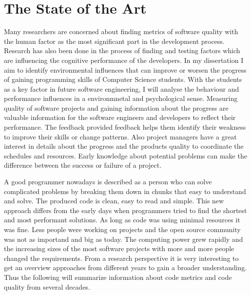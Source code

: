 \chapter{The State of the Art}

\begin{flushleft}
Many researchers are concerned about finding metrics of software quality with the human factor as the most significant part in the development process. 
Research has also been done in the process of finding and testing factors which are influencing the cognitive performance of the developers.
In my dissertation I aim to identify environmental influences that can improve or worsen the progress of gaining programming skills of Computer Science students.
With the students as a key factor in future software engineering, I will analyse the behaviour and performance influences in a environmnetal and psychological sense. 
\cite{denissen2008effects}
Measuring quality of software projects and gaining information about the progress are valuable information for the software engineers and developers to reflect their performance. The feedback provided feedback helps them identify their weakness to improve their skills or change patterns. 
\cite{johnson1999leap}
\cite{Martin:2008:CCH:1388398}
Also project managers have a great interest in details about the progress and the products quality to coordinate the schedules and resources. 
Early knowledge about potential problems can make the difference between the success or failure of a project.

A good programmer nowadays is described as a person who can solve complicated problems by breaking them down in chunks that easy to understand and solve. The produced code is clean, easy to read and simple. \cite{johnson1999leap}
This new approach differs from the early days when programmers tried to find the shortest and most performant solutions. As long as code was using minimal resources it was fine. Less people were working on projects and the open source community was not as importand and big as today. 
The computing power grew rapidly and the increasing sizes of the most software projects with more and more people changed the requirements. 
From a research perspective it is very interesting to get an overview approaches from different years to gain a broader understanding. Thus the following will summarize information about code metrics and code quality from several decades.
\end{flushleft}

